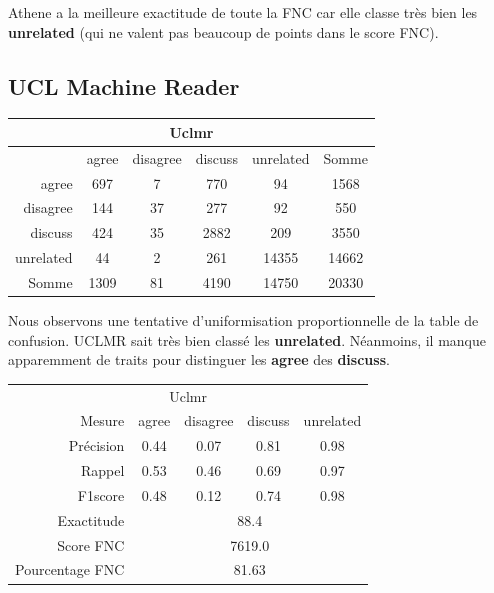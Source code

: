 \documentclass[11pt,a4paper,oldfontcommands]{memoir}
\begin{document}
Athene a la meilleure exactitude de toute la FNC car elle classe très bien les \textbf{unrelated} (qui ne valent pas beaucoup de points dans le score FNC).


\subsection{UCL Machine Reader}




\begin{center}
 \begin{tabular}{ r | c c c c | c }
  \multicolumn{6}{c}{Uclmr}                                  \\
  \hline
            & agree & disagree & discuss & unrelated & Somme \\
  \hline
  agree     & 697   & 7        & 770     & 94        & 1568  \\
  disagree  & 144   & 37       & 277     & 92        & 550   \\
  discuss   & 424   & 35       & 2882    & 209       & 3550  \\
  unrelated & 44    & 2        & 261     & 14355     & 14662 \\
  \hline
  Somme     & 1309  & 81       & 4190    & 14750     & 20330 \\
 \end{tabular}
\end{center}


Nous observons une tentative d'uniformisation proportionnelle de la table de confusion.
UCLMR sait très bien classé les \textbf{unrelated}. Néanmoins, il manque apparemment de traits pour distinguer les \textbf{agree} des \textbf{discuss}.


\begin{center}
 \begin{tabular}{ r | c c c c }
  \multicolumn{5}{c}{Uclmr}                                                     \\
  Mesure          & agree                      & disagree & discuss & unrelated \\
  \hline
  Précision       & 0.44                       & 0.07     & 0.81    & 0.98      \\
  Rappel          & 0.53                       & 0.46     & 0.69    & 0.97      \\
  F1score         & 0.48                       & 0.12     & 0.74    & 0.98      \\
  \hline
  \hline
  Exactitude      & \multicolumn{4}{c}{88.4}                                    \\
  Score FNC       & \multicolumn{4}{c}{7619.0}                                  \\
  Pourcentage FNC & \multicolumn{4}{c}{81.63}                                   \\
 \end{tabular}
\end{center}
\end{document}
